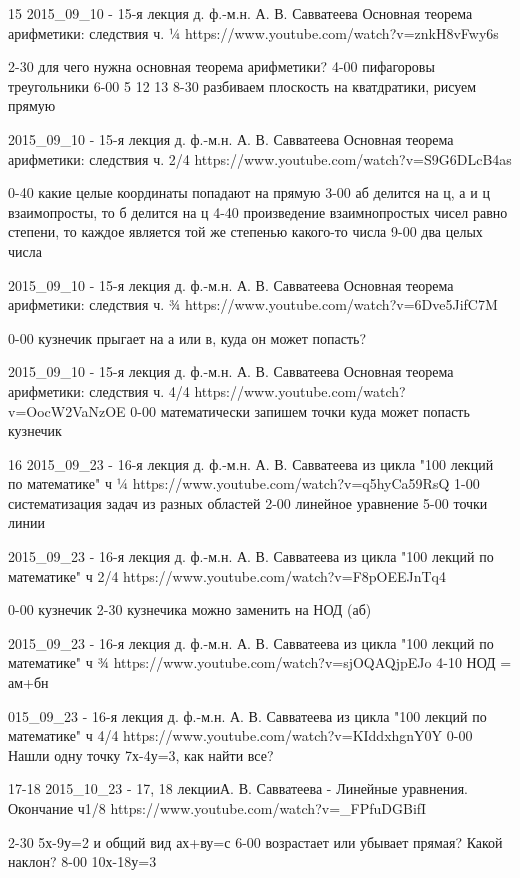 15
2015_09_10 - 15-я лекция д. ф.-м.н. А. В. Савватеева Основная теорема арифметики: следствия ч. ¼
https://www.youtube.com/watch?v=znkH8vFwy6s

2-30 для чего нужна основная теорема арифметики?
4-00 пифагоровы треугольники
6-00 5 12 13
8-30 разбиваем плоскость на кватдратики, рисуем прямую

2015_09_10 - 15-я лекция д. ф.-м.н. А. В. Савватеева Основная теорема арифметики: следствия ч. 2/4
https://www.youtube.com/watch?v=S9G6DLcB4as

0-40 какие целые координаты попадают на прямую
3-00 аб делится на ц, а и ц взаимопросты, то б делится на ц
4-40 произведение взаимнопростых чисел равно степени, то каждое является той же степенью какого-то числа
9-00 два целых числа

2015_09_10 - 15-я лекция д. ф.-м.н. А. В. Савватеева Основная теорема арифметики: следствия ч. ¾
https://www.youtube.com/watch?v=6Dve5JifC7M

0-00 кузнечик прыгает на а или в, куда он может попасть?

2015_09_10 - 15-я лекция д. ф.-м.н. А. В. Савватеева Основная теорема арифметики: следствия ч. 4/4
https://www.youtube.com/watch?v=OocW2VaNzOE
0-00 математически запишем точки куда может попасть кузнечик

16
2015_09_23 - 16-я лекция д. ф.-м.н. А. В. Савватеева из цикла "100 лекций по математике" ч ¼
https://www.youtube.com/watch?v=q5hyCa59RsQ
1-00 систематизация задач из разных областей
2-00 линейное уравнение
5-00 точки линии

2015_09_23 - 16-я лекция д. ф.-м.н. А. В. Савватеева из цикла "100 лекций по математике" ч 2/4
https://www.youtube.com/watch?v=F8pOEEJnTq4

0-00 кузнечик
2-30 кузнечика можно заменить на НОД (аб)

2015_09_23 - 16-я лекция д. ф.-м.н. А. В. Савватеева из цикла "100 лекций по математике" ч ¾
https://www.youtube.com/watch?v=sjOQAQjpEJo
4-10 НОД = ам+бн

015_09_23 - 16-я лекция д. ф.-м.н. А. В. Савватеева из цикла "100 лекций по математике" ч 4/4
https://www.youtube.com/watch?v=KIddxhgnY0Y
0-00 Нашли одну точку 7х-4у=3, как найти все?

17-18
2015_10_23 - 17, 18 лекцииА. В. Савватеева - Линейные уравнения. Окончание ч1/8
https://www.youtube.com/watch?v=_FPfuDGBifI

2-30 5х-9у=2  и общий вид ах+ву=с
6-00 возрастает или убывает прямая? Какой наклон?
8-00 10х-18у=3

